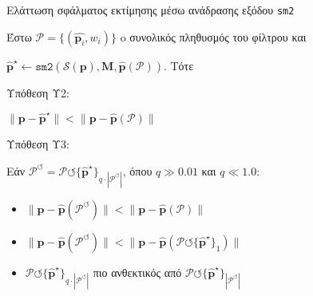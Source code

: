 \begin{frame}[fragile]{Ελάττωση σφάλματος εκτίμησης μέσω ανάδρασης εξόδου \texttt{sm2}}

  Έστω $\mathcal{P} = \{(\hat{\bm{p}_i}, w_i)\}$ o συνολικός πληθυσμός του φίλτρου και

  $\hat{\bm{p}}^\star \leftarrow \texttt{sm2}(\mathcal{S}(\bm{p}), \bm{M}, \hat{\bm{p}}(\mathcal{P}))$. Τότε \vspace{0.3cm}

  Υπόθεση Υ2: \vspace{-0.6cm}
  \begin{bw_box}
    $\|\bm{p} - \hat{\bm{p}}^\star\| < \|\bm{p} - \hat{\bm{p}}(\mathcal{P})\|$
  \end{bw_box} \vspace{0.4cm}

  Υπόθεση Υ3: \vspace{-0.6cm}
  \begin{bw_box}

    Εάν $\mathcal{P}^\circlearrowleft = \mathcal{P} \circlearrowleft \{\hat{\bm{p}}^\star\}_{q \cdot |\mathcal{P}^\circlearrowleft|}$,
    όπου $q \gg 0.01$ και $q \ll 1.0$:

    \begin{itemize}
      \item $\|\bm{p} - \hat{\bm{p}}(\mathcal{P}^\circlearrowleft)\|                          < \|\bm{p} - \hat{\bm{p}}(\mathcal{P})\| $
      \item $\|\bm{p} - \hat{\bm{p}}(\mathcal{P}^\circlearrowleft)\| < \|\bm{p} - \hat{\bm{p}}(\mathcal{P} \circlearrowleft \{\hat{\bm{p}}^\star\}_1)\|$
      \item $\mathcal{P} \circlearrowleft \{\hat{\bm{p}}^\star\}_{q \cdot |\mathcal{P}^\circlearrowleft|}$ πιο ανθεκτικός από $\mathcal{P} \circlearrowleft \{\hat{\bm{p}}^\star\}_{|\mathcal{P}^\circlearrowleft|}$
    \end{itemize}

  \end{bw_box}

\end{frame}
